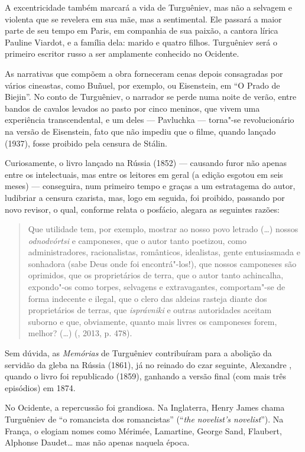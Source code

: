 A excentricidade também marcará a vida de Turguêniev, mas não a selvagem e violenta que se revelera em sua mãe, mas a sentimental. Ele passará a maior parte de seu tempo em Paris, em companhia de sua paixão, a cantora lírica Pauline Viardot, e a família dela: marido e quatro filhos. Turguêniev será o primeiro escritor russo a ser amplamente conhecido no
Ocidente.

As narrativas que compõem a obra forneceram cenas depois consagradas por vários cineastas, como Buñuel, por exemplo, ou Eisenstein, em ``O Prado de Biejin''. No conto de Turguêniev, o narrador se perde numa noite de verão, entre bandos de cavalos levados ao pasto por cinco meninos, que vivem uma experiência transcendental, e um deles --- Pavluchka --- torna"-se revolucionário na versão de Eisenstein, fato que não impediu que o filme, quando lançado (1937), fosse proibido pela
censura de Stálin.

Curiosamente, o livro lançado na Rússia (1852) --- causando furor não apenas entre os intelectuais, mas entre os leitores em geral (a edição esgotou em seis meses) --- conseguira, num primeiro tempo e graças a um estratagema do autor, ludibriar a censura czarista, mas, logo em seguida, foi proibido, passando por novo revisor, o qual, conforme relata o posfácio, alegara as seguintes razões:

\begin{quotation}
Que utilidade tem, por exemplo, mostrar ao nosso povo letrado (\ldots{}) nossos \emph{odnodvórtsi} e camponeses, que o autor tanto poetizou, como administradores, racionalistas, românticos, idealistas, gente entusiasmada e sonhadora (sabe Deus onde foi encontrá"-los!), que nossos camponeses são oprimidos, que os proprietários de terra, que o autor tanto achincalha, expondo"-os como torpes, selvagens e extravagantes, comportam"-se de forma indecente e ilegal, que o clero das aldeias rasteja diante dos proprietários de terras, que \emph{isprávniki} e outras autoridades aceitam suborno e que, obviamente, quanto mais livres
os camponeses forem, melhor? (\ldots{}) (, 2013, p. 478).
\end{quotation}

Sem dúvida, as \emph{Memórias} de Turguêniev contribuíram para a abolição da servidão da gleba na Rússia (1861), já no reinado do czar seguinte, Alexandre , quando o livro foi republicado (1859), ganhando a versão final (com mais três episódios) em 1874.

No Ocidente, a repercussão foi grandiosa. Na Inglaterra, Henry James chama Turguêniev de ``o romancista dos romancistas'' (``\emph{the novelist's novelist}''). Na França, o elogiam nomes como Mérimée, Lamartine, George Sand, Flaubert, Alphonse Daudet\ldots{} mas não apenas naquela época.

